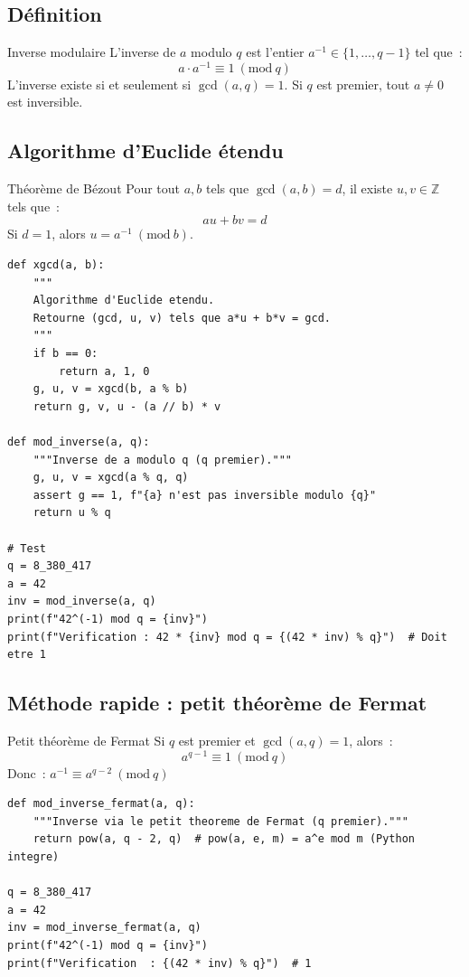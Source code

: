 \documentclass[12pt, a4paper]{article}
\newcommand{\ZZ}{\mathbb{Z}}
\newcommand{\pmod}[1]{\ (\mathrm{mod}\ #1)}
\begin{document}
\subsection{Définition}

\begin{defbox}{Inverse modulaire}
L'inverse de $a$ modulo $q$ est l'entier $a^{-1} \in \{1, \ldots, q-1\}$
tel que~:
$$a \cdot a^{-1} \equiv 1 \pmod{q}$$
L'inverse existe si et seulement si $\gcd(a, q) = 1$.
Si $q$ est premier, tout $a \neq 0$ est inversible.
\end{defbox}

\subsection{Algorithme d'Euclide étendu}

\begin{theorembox}{Théorème de Bézout}
Pour tout $a, b$ tels que $\gcd(a, b) = d$, il existe $u, v \in \ZZ$
tels que~:
$$au + bv = d$$
Si $d = 1$, alors $u = a^{-1} \pmod{b}$.
\end{theorembox}

\begin{lstlisting}[style=python]
def xgcd(a, b):
    """
    Algorithme d'Euclide etendu.
    Retourne (gcd, u, v) tels que a*u + b*v = gcd.
    """
    if b == 0:
        return a, 1, 0
    g, u, v = xgcd(b, a % b)
    return g, v, u - (a // b) * v

def mod_inverse(a, q):
    """Inverse de a modulo q (q premier)."""
    g, u, v = xgcd(a % q, q)
    assert g == 1, f"{a} n'est pas inversible modulo {q}"
    return u % q

# Test
q = 8_380_417
a = 42
inv = mod_inverse(a, q)
print(f"42^(-1) mod q = {inv}")
print(f"Verification : 42 * {inv} mod q = {(42 * inv) % q}")  # Doit etre 1
\end{lstlisting}

\subsection{Méthode rapide : petit théorème de Fermat}

\begin{theorembox}{Petit théorème de Fermat}
Si $q$ est premier et $\gcd(a, q) = 1$, alors~:
$$a^{q-1} \equiv 1 \pmod{q}$$
Donc~: $a^{-1} \equiv a^{q-2} \pmod{q}$
\end{theorembox}

\begin{lstlisting}[style=python]
def mod_inverse_fermat(a, q):
    """Inverse via le petit theoreme de Fermat (q premier)."""
    return pow(a, q - 2, q)  # pow(a, e, m) = a^e mod m (Python integre)

q = 8_380_417
a = 42
inv = mod_inverse_fermat(a, q)
print(f"42^(-1) mod q = {inv}")
print(f"Verification  : {(42 * inv) % q}")  # 1
\end{lstlisting}
\end{document}
